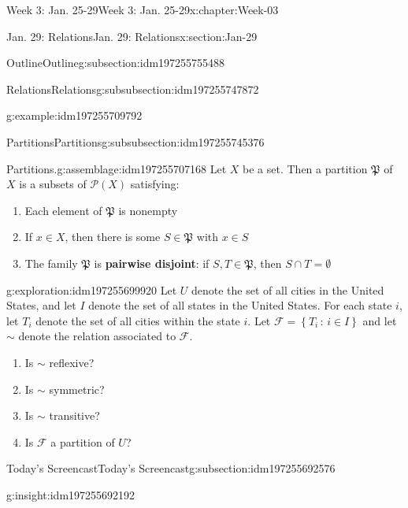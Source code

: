 \documentclass[oneside,10pt,]{book}
\newcommand{\terminology}[1]{\textbf{#1}}
\numberwithin{equation}{section}
\newlength{\qrsize}
\newcommand{\setof}[2]{{\left\{#1\,\colon\,#2\right\}}}
\def\pow{{\mathcal P}}
\newcommand{\pow}{\mathcal P}
\begin{document}
\begin{chapterptx}{Week 3: Jan. 25-29}{}{Week 3: Jan. 25-29}{}{}{x:chapter:Week-03}
\begin{sectionptx}{Jan. 29: Relations}{}{Jan. 29: Relations}{}{}{x:section:Jan-29}
\begin{subsectionptx}{Outline}{}{Outline}{}{}{g:subsection:idm197255755488}
\begin{subsubsectionptx}{Relations}{}{Relations}{}{}{g:subsubsection:idm197255747872}
\begin{example}{}{g:example:idm197255709792}
\end{example}
\end{subsubsectionptx}
%
%
\typeout{************************************************}
\typeout{************************************************}
%
\begin{subsubsectionptx}{Partitions}{}{Partitions}{}{}{g:subsubsection:idm197255745376}
\begin{assemblage}{Partitions.}{g:assemblage:idm197255707168}%
Let \(X\) be a set. Then a partition \(\mathfrak{P}\) of \(X\) is a subsets of \(\pow(X)\) satisfying: %
\begin{enumerate}
\item{}Each element of \(\mathfrak{P}\) is nonempty%
\item{}If \(x\in X\), then there is some \(S\in \mathfrak{P}\) with \(x\in S\)%
\item{}The family \(\mathfrak{P}\) is \terminology{pairwise disjoint}: if \(S,T\in \mathfrak{P}\), then \(S\cap T = \emptyset\)%
\end{enumerate}
%
\end{assemblage}
\begin{exploration}{}{g:exploration:idm197255699920}%
Let \(U\) denote the set of all cities in the United States, and let \(I\) denote the set of all states in the United States. For each state \(i\), let \(T_i\) denote the set of all cities within the state \(i\). Let \(\mathcal{F} = \setof{T_i}{i\in I}\) and let \(\sim\) denote the relation associated to \(\mathcal{F}\).%
%
\begin{enumerate}
\item{}Is \(\sim\) reflexive?%
\item{}Is \(\sim\) symmetric?%
\item{}Is \(\sim\) transitive?%
\item{}Is \(\mathcal{F}\) a partition of \(U\)?%
\end{enumerate}
\end{exploration}%
\end{subsubsectionptx}
\end{subsectionptx}
%
%
\typeout{************************************************}
\typeout{************************************************}
%
\begin{subsectionptx}{Today's Screencast}{}{Today's Screencast}{}{}{g:subsection:idm197255692576}
\begin{insight}{}{g:insight:idm197255692192}%
\setlength{\qrsize}{9em}

\end{insight}
\end{subsectionptx}
\end{sectionptx}
\end{chapterptx}
\end{document}
